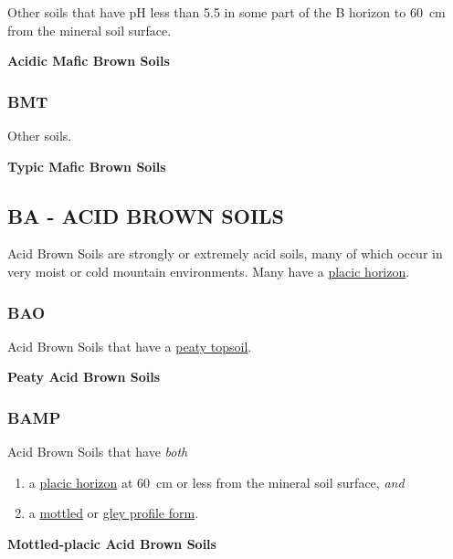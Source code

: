 \documentclass[
  letterpaper,
  DIV=11,
  numbers=noendperiod]{scrreprt}
\providecommand{\tightlist}{%
  \setlength{\itemsep}{0pt}\setlength{\parskip}{0pt}}\usepackage{longtable,booktabs,array}
\begin{document}
Other soils that have pH less than 5.5 in some part of the B horizon to
60~cm from the mineral soil surface.

\textbf{Acidic Mafic Brown Soils}

\hypertarget{sec-key-BMT}{%
\subsubsection{\texorpdfstring{\textbf{BMT}}{BMT}}\label{sec-key-BMT}}

Other soils.

\textbf{Typic Mafic Brown Soils}

\hypertarget{sec-BA}{%
\subsection{\texorpdfstring{\textbf{BA} - ACID BROWN
SOILS}{BA - ACID BROWN SOILS}}\label{sec-BA}}

Acid Brown Soils are strongly or extremely acid soils, many of which
occur in very moist or cold mountain environments. Many have a
\protect\hyperlink{sec-diag-plac}{placic horizon}.

\hypertarget{sec-key-BAO}{%
\subsubsection{\texorpdfstring{\textbf{BAO}}{BAO}}\label{sec-key-BAO}}

Acid Brown Soils that have a \protect\hyperlink{sec-diag-pts}{peaty
topsoil}.

\textbf{Peaty Acid Brown Soils}

\hypertarget{sec-key-BAMP}{%
\subsubsection{\texorpdfstring{\textbf{BAMP}}{BAMP}}\label{sec-key-BAMP}}

Acid Brown Soils that have \emph{both}

\begin{enumerate}
\def\labelenumi{\arabic{enumi}.}
\tightlist
\item
  a \protect\hyperlink{sec-diag-plac}{placic horizon} at 60~cm or less
  from the mineral soil surface, \emph{and}
\item
  a \protect\hyperlink{sec-diag-mottpf}{mottled} or
  \protect\hyperlink{sec-diag-gleypf}{gley profile form}.
\end{enumerate}

\textbf{Mottled-placic Acid Brown Soils}
\end{document}

